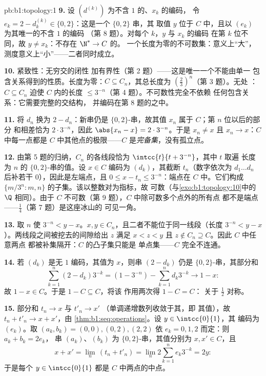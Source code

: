 \begin{solution}{pb:b1:topology:1}
\textbf{9.} 设 $(d^{(k)})$ 为不含 $1$ 的、$x_k$ 的编码，
令 $e_k = 2 - d^{(k)}_k \in \{0, 2\}$：这是一个 $\{0,2\}$ 串，其
取值 $y$ 位于 $C$ 中，且以 $(e_k)$ 为其唯一的不含 $1$ 的编码
（第 8 题）。对每个 $k$，$y$ 与 $x_k$ 的编码
在第 $k$ 位不同，故 $y \neq x_k$：不存在 $\N^* \to C$ 的。
一个长度为零的不可数集：意义上“大”，
测度意义上“小”——二者同时成立。

\textbf{10.} 紧致性：无穷交的闭性
加有界性（第 2 题）——这是唯一一个不能由单一
包含关系得到的性质。长度为零：$C \subseteq
C_n$，其总长度为 $(\frac23)^n$（第 3 题）。无处
：$C \subseteq C_n$ 迫使 $C$ 内的长度
$\leq 3^{-n}$（第 4 题）。不可数性完全不依赖
任何包含关系：它需要完整的交结构，
并编码在第 8 题的之中。

\textbf{11.} 将 $d_n$ 换为 $2 - d_n$：新串仍是
$\{0,2\}$-串，故其值 $x_n$ 属于 $C$；第 $n$ 位以后的部分
和相差恰为 $2\cdot3^{-n}$，因此
$\abs{x_n - x} = 2\cdot3^{-n}$。于是 $x_n \neq x$ 且 $x_n \to
x$：$C$ 中每一点都是 $C$ 中其他点的极限——$C$
是\emph{完备集}，没有孤立点。

\textbf{12.} 由第 5 题的归纳，$C_n$ 的各线段恰为
$\intcc{t}{t + 3^{-n}}$，其中 $t$ 取遍
长度为 $n$ 的 $\{0,2\}$-串的值。设 $x \in C$
编码为 $(d_k)$，其截断 $t_n$（数字依次为 $d_1 \dots d_n$
后补若干 $0$），因此是左端点，且 $0 \leq x - t_n
\leq 3^{-n}$：端点在 $C$ 中。它们构成
$\{m/3^n : m, n\}$ 的子集。该以整数对为指标，故
可数（与\cref{exo:b1:topology:10}中的 $\Q$ 相同）。由于 $C$
不可数（第 9 题），$C$ 中除可数多个点外的所有点
都不是端点——$\frac14$（第 7 题）是这座冰山的
可见一角。

\textbf{13.} 取 $n$ 使 $3^{-n} < y - x$。$x, y \in
C_n$，且二者不能位于同一线段（长度 $3^{-n} <
y - x$）。两线段之间被挖去的间隙给出 $z$
满足 $x < z < y$ 且 $z \notin C_n \supseteq C$。因此 $C$ 中任意两点
都被补集隔开：$C$ 的凸子集只能是
单点集——$C$ 完全不连通。

\textbf{14.} 若 $(d_k)$ 是无 $1$ 编码，其值为 $x$，则串
$(2 - d_k)$ 仍是 $\{0,2\}$-串，其部分和
\[
\sum_{k=1}^{n} (2 - d_k)3^{-k} = (1 - 3^{-n}) - \sum_{k=1}^n
d_k 3^{-k} \longrightarrow 1 - x :
\]
故 $1 - x \in C$。于是 $1 - C \subseteq C$，将该
作用两次得 $1 - C = C$：
关于 $\frac12$ 对称。

\textbf{15.} 部分和 $t_n \to x$ 与 $t'_n \to x'$
（单调递增数列收敛于其，即
其值），故 $t_n + t'_n \to x + x'$，由
\cref{thm:b1:seq:operations}。设 $y \in \intcc{0}{1}$，其
编码为 $(e_k)$。取 $(a_k, b_k) = (0,0), (0,2), (2,2)$
依 $e_k = 0, 1, 2$ 而定：则 $a_k + b_k = 2e_k$，
串 $(a_k)$、$(b_k)$ 为 $\{0,2\}$-串，其值分别为 $x,
x' \in C$，且
\[
x + x' = \lim_n\,(t_n + t'_n) = \lim_n 2\sum_{k=1}^n e_k 3^{-k}
= 2y :
\]
于是每个 $y \in \intcc{0}{1}$ 都是 $C$ 中两点的中点。


\end{solution}
